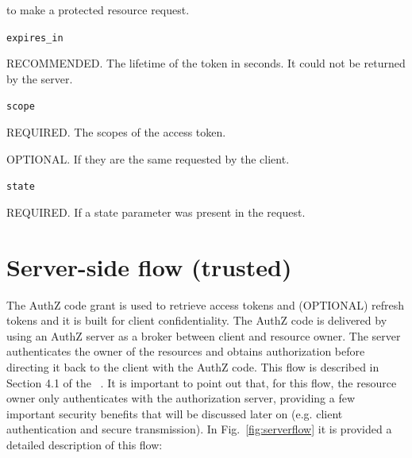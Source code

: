 \hspace{0.5cm}to make a protected resource request.

\texttt{expires\_in}

\hspace{0.5cm}RECOMMENDED. The lifetime of the token in seconds. It could not be returned by the server.

\texttt{scope}

\hspace{0.5cm}REQUIRED. The scopes of the access token.

\hspace{0.5cm}OPTIONAL. If they are the same requested by the client.

\texttt{state}

\hspace{0.5cm}REQUIRED. If a state parameter was present in the request.

\section{Server-side flow (trusted)}
\label{authcg}

The AuthZ code grant is used to retrieve access tokens and (OPTIONAL) refresh tokens and it is built for client confidentiality. The AuthZ code is delivered by using an AuthZ server as a broker between client and resource owner. The server authenticates the owner of the resources and obtains authorization before directing it back to the client with the AuthZ code. This flow is described in Section 4.1 of the \ \cite{RFC6749}. It is important to point out that, for this flow, the resource owner only authenticates with the authorization server, providing a few important security benefits that will be discussed later on (e.g. client authentication and secure transmission). In Fig.~\ref{fig:serverflow} it is provided a detailed description of this flow:

